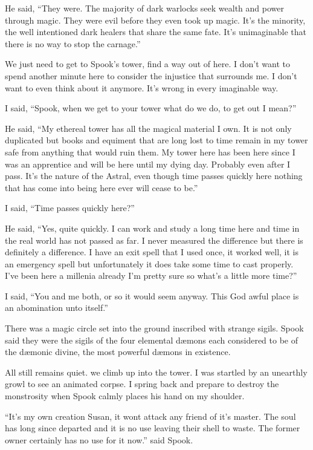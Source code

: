 He said, ``They were. The majority of dark warlocks seek wealth and power through magic. They were evil before they even took up magic. It's the minority, the well intentioned dark healers that share the same fate. It's unimaginable that there is no way to stop the carnage.''

We just need to get to Spook's tower, find a way out of here. I don't want to spend another minute here to consider the injustice that surrounds me. I don't want to even think about it anymore. It's wrong in every imaginable way.

I said, ``Spook, when we get to your tower what do we do, to get out I mean?''

He said, ``My ethereal tower has all the magical material I own. It is not only duplicated but books and equiment that are long lost to time remain in my tower safe from anything that would ruin them. My tower here has been here since I was an apprentice and will be here until my dying day. Probably even after I pass. It's the nature of the Astral, even though time passes quickly here nothing that has come into being here ever will cease to be.''

I said, ``Time passes quickly here?''

He said, ``Yes, quite quickly. I can work and study a long time here and time in the real world has not passed as far. I never measured the difference but there is definitely a difference. I have an exit spell that I used once, it worked well, it is an emergency spell but unfortunately it does take some time to cast properly. I've been here a millenia already I'm pretty sure so what's a little more time?''

I said, ``You and me both, or so it would seem anyway. This God awful place is an abomination unto itself.''

There was a magic circle set into the ground inscribed with strange sigils. Spook said they were the sigils of the four elemental d\ae mons each considered to be of the d\ae monic divine, the most powerful d\ae mons in existence.

All still remains quiet. we climb up into the tower. I was startled by an unearthly growl to see an animated corpse. I spring back and prepare to destroy the monstrosity when Spook calmly places his hand on my shoulder.

``It's my own creation Susan, it wont attack any friend of it's master. The soul has long since departed and it is no use leaving their shell to waste. The former owner certainly has no use for it now.'' said Spook.

